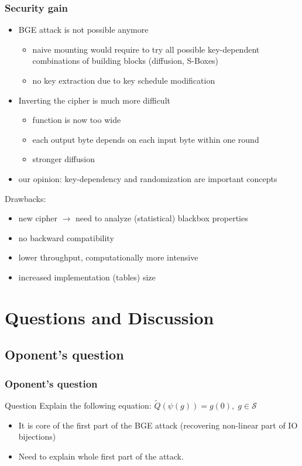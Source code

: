 \documentclass{beamer}
\begin{document}
\begin{frame}
    \frametitle{Security gain}
    \begin{itemize}
     \item BGE attack is not possible anymore
     \begin{itemize}
      \item naive mounting would require to try all possible key-dependent combinations of building blocks (diffusion, S-Boxes)
      \item no key extraction due to key schedule modification
     \end{itemize}
     \item Inverting the cipher is much more difficult
     \begin{itemize}
	\item function is now too wide
	\item each output byte depends on each input byte within one round
	\item stronger diffusion
     \end{itemize}
     \item our opinion: key-dependency and randomization are important concepts
    \end{itemize}
    
    Drawbacks:
    \begin{itemize}
     \item new cipher $\rightarrow$ need to analyze (statistical) blackbox properties
     \item no backward compatibility
     \item lower throughput, computationally more intensive
     \item increased implementation (tables) size 
    \end{itemize}
\end{frame}


\section{Questions and Discussion}
\subsection{Oponent's question}

\begin{frame}
    \frametitle{Oponent's question}
    \begin{block}{Question}
     Explain the following equation: $\widetilde{Q}(\psi(g)) = g(0), \; g \in \mathcal{S}$
    \end{block}
    \begin{itemize}
     \item It is core of the first part of the BGE attack (recovering non-linear part of IO bijections)
     \item Need to explain whole first part of the attack.
    \end{itemize}
\end{frame}
\end{document}
